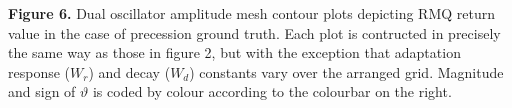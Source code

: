 \documentclass[12pt, letterpaper]{article}
\newenvironment{collapsable}{}{}
\begin{document}
\begin{collapsable}
  \vspace{12pt}

  \begin{center}
  \end{center}
  {\bf Figure 6.} Dual oscillator amplitude mesh contour plots depicting RMQ return value in
  the case of precession ground truth. Each plot is contructed in precisely the
  same way as those in figure 2, but with the exception that adaptation response
  ($W_r$) and decay ($W_d$) constants vary over the arranged grid. Magnitude and
  sign of $\vartheta$ is coded by colour according to the colourbar on the right.


\end{collapsable}
\end{document}
